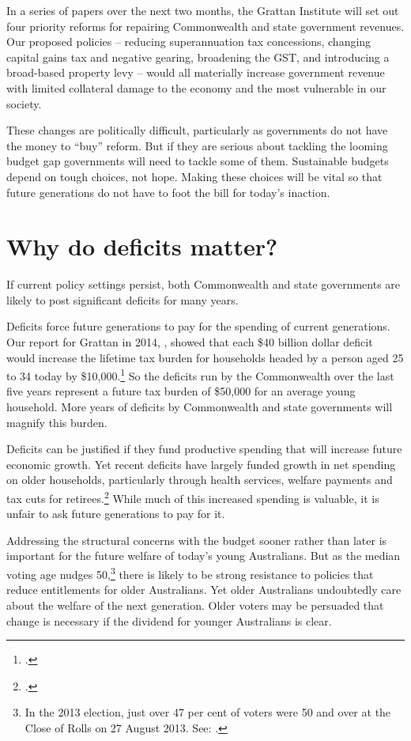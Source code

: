 \begin{overview}[-43pt]
In a series of papers over the next two months, the Grattan Institute will set out four priority reforms for repairing Commonwealth and state government revenues. Our proposed policies – reducing superannuation tax concessions, changing capital gains tax and negative gearing, broadening the GST, and introducing a broad-based property levy – would all materially increase government revenue with limited collateral damage to the economy and the most vulnerable in our society.

These changes are politically difficult, particularly as governments do not have the money to “buy” reform. But if they are serious about tackling the looming budget gap governments will need to tackle some of them. Sustainable budgets depend on tough choices, not hope. Making these choices will be vital so that future generations do not have to foot the bill for today’s inaction.

\end{overview}

\chapter{Why do deficits matter?}\label{chapter:FISCAL-1}
If current policy settings persist, both Commonwealth and state governments are likely to post significant deficits for many years. 

Deficits force future generations to pay for the spending of current generations. Our report for Grattan in 2014, , showed that each \$40 billion dollar deficit would increase the lifetime tax burden for households headed by a person aged 25 to 34 today by \$10,000.\footcite[][9]{DaleyWoodWeidmannEtAl2014} So the deficits run by the Commonwealth over the last five years represent a future tax burden of \$50,000 for an average young household. More years of deficits by Commonwealth and state governments will magnify this burden. 

Deficits can be justified if they fund productive spending that will increase future economic growth. Yet recent deficits have largely funded growth in net spending on older households, particularly through health services, welfare payments and tax cuts for retirees.\footcite[][9]{DaleyWoodWeidmannEtAl2014}  While much of this increased spending is valuable, it is unfair to ask future generations to pay for it. 

Addressing the structural concerns with the budget sooner rather than later is important for the future welfare of today’s young Australians. But as the median voting age nudges 50,\footnote{In the 2013 election, just over 47 per cent of voters were 50 and over at the Close of Rolls on 27 August 2013. See: \textcite{AEC2013}.}  there is likely to be strong resistance to policies that reduce entitlements for older Australians. Yet older Australians undoubtedly care about the welfare of the next generation. Older voters may be persuaded that change is necessary if the dividend for younger Australians is clear. 

